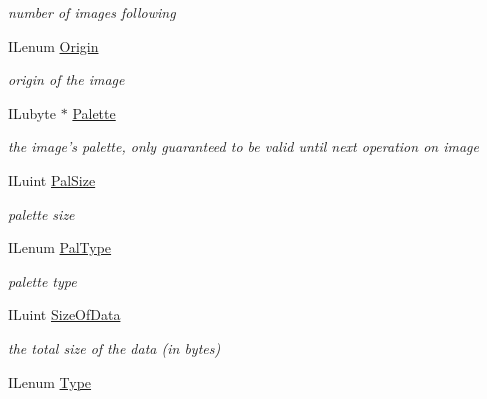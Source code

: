 \begin{DoxyCompactItemize}
\begin{DoxyCompactList}\small\item\em number of images following \end{DoxyCompactList}\item 
\hypertarget{struct_i_l_uinfo_a6f7c49ddc9cd419e2d2af24255df902a}{I\-Lenum \hyperlink{struct_i_l_uinfo_a6f7c49ddc9cd419e2d2af24255df902a}{Origin}}\label{struct_i_l_uinfo_a6f7c49ddc9cd419e2d2af24255df902a}

\begin{DoxyCompactList}\small\item\em origin of the image \end{DoxyCompactList}\item 
\hypertarget{struct_i_l_uinfo_ab520cff305ed9ee13d2eac7a87ac1d92}{I\-Lubyte $\ast$ \hyperlink{struct_i_l_uinfo_ab520cff305ed9ee13d2eac7a87ac1d92}{Palette}}\label{struct_i_l_uinfo_ab520cff305ed9ee13d2eac7a87ac1d92}

\begin{DoxyCompactList}\small\item\em the image's palette, only guaranteed to be valid until next operation on image \end{DoxyCompactList}\item 
\hypertarget{struct_i_l_uinfo_a728a63d4c8b857a800a4d19e250a8c4b}{I\-Luint \hyperlink{struct_i_l_uinfo_a728a63d4c8b857a800a4d19e250a8c4b}{Pal\-Size}}\label{struct_i_l_uinfo_a728a63d4c8b857a800a4d19e250a8c4b}

\begin{DoxyCompactList}\small\item\em palette size \end{DoxyCompactList}\item 
\hypertarget{struct_i_l_uinfo_ab091aab8d79003031a4e9957e85f43ca}{I\-Lenum \hyperlink{struct_i_l_uinfo_ab091aab8d79003031a4e9957e85f43ca}{Pal\-Type}}\label{struct_i_l_uinfo_ab091aab8d79003031a4e9957e85f43ca}

\begin{DoxyCompactList}\small\item\em palette type \end{DoxyCompactList}\item 
\hypertarget{struct_i_l_uinfo_ad3bfe4c8a6696b42835730f7b70327b7}{I\-Luint \hyperlink{struct_i_l_uinfo_ad3bfe4c8a6696b42835730f7b70327b7}{Size\-Of\-Data}}\label{struct_i_l_uinfo_ad3bfe4c8a6696b42835730f7b70327b7}

\begin{DoxyCompactList}\small\item\em the total size of the data (in bytes) \end{DoxyCompactList}\item 
\hypertarget{struct_i_l_uinfo_a437e4fc3b579e2e7879dedd0fd2ac587}{I\-Lenum \hyperlink{struct_i_l_uinfo_a437e4fc3b579e2e7879dedd0fd2ac587}{Type}}\label{struct_i_l_uinfo_a437e4fc3b579e2e7879dedd0fd2ac587}


\end{DoxyCompactItemize}
